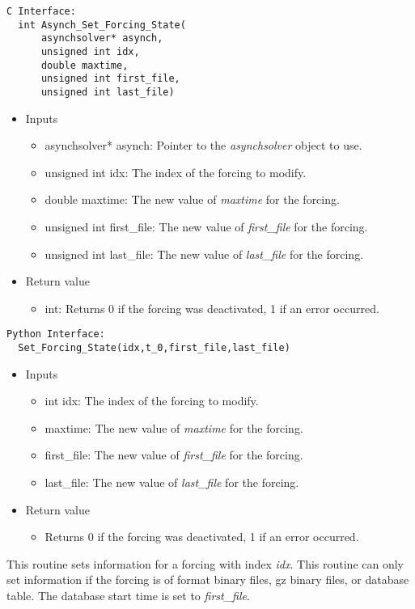 \documentclass[12pt]{article}
\begin{document}
\begin{lstlisting}[style=CStyle]
  C Interface:
  int Asynch_Set_Forcing_State(
      asynchsolver* asynch,
      unsigned int idx,
      double maxtime,
      unsigned int first_file,
      unsigned int last_file)
\end{lstlisting}
\begin{itemize}
 \item Inputs
  \begin{itemize}
   \item asynchsolver* asynch: Pointer to the \emph{asynchsolver} object to use.
   \item unsigned int idx: The index of the forcing to modify.
   \item double maxtime: The new value of \emph{maxtime} for the forcing.
   \item unsigned int first\_file: The new value of \emph{first\_file} for the forcing.
   \item unsigned int last\_file: The new value of \emph{last\_file} for the forcing.
  \end{itemize}
 \item Return value
  \begin{itemize}
   \item int: Returns 0 if the forcing was deactivated, 1 if an error occurred.
  \end{itemize}
\end{itemize}
\begin{lstlisting}[style=PythonStyle]
  Python Interface:
  Set_Forcing_State(idx,t_0,first_file,last_file)
\end{lstlisting}
\begin{itemize}
 \item Inputs
  \begin{itemize}
   \item int idx: The index of the forcing to modify.
   \item maxtime: The new value of \emph{maxtime} for the forcing.
   \item first\_file: The new value of \emph{first\_file} for the forcing.
   \item last\_file: The new value of \emph{last\_file} for the forcing.
  \end{itemize}
 \item Return value
  \begin{itemize}
   \item Returns 0 if the forcing was deactivated, 1 if an error occurred.
  \end{itemize}
\end{itemize}
This routine sets information for a forcing with index \emph{idx}. This routine can only set information if the forcing is of format binary files, gz binary files, or database table. The database start time is set to \emph{first\_file}.
\end{document}
